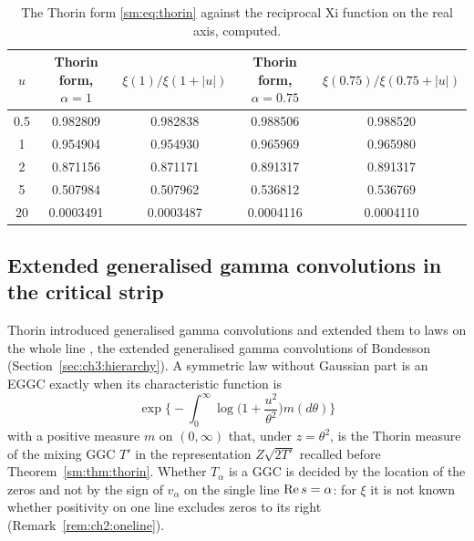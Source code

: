 \begin{table}[htbp]
\centering\small
\setlength{\tabcolsep}{4pt}
\begin{tabular}{@{}ccccc@{}}
\toprule
$u$ & Thorin form, $\alpha=1$ & $\xi(1)/\xi(1+|u|)$ & Thorin form, $\alpha=0.75$ & $\xi(0.75)/\xi(0.75+|u|)$\\
\midrule
0.5 & 0.982809 & 0.982838 & 0.988506 & 0.988520\\
1 & 0.954904 & 0.954930 & 0.965969 & 0.965980\\
2 & 0.871156 & 0.871171 & 0.891317 & 0.891317\\
5 & 0.507984 & 0.507962 & 0.536812 & 0.536769\\
20 & 0.0003491 & 0.0003487 & 0.0004116 & 0.0004110\\
\bottomrule
\end{tabular}
\caption{The Thorin form \eqref{sm:eq:thorin} against the reciprocal Xi function on the real axis, computed.}
\label{sm:tab:thorin}
\end{table}

\subsection{Extended generalised gamma convolutions in the critical strip}\label{sm:sec:strip}

Thorin introduced generalised gamma convolutions \cite{Thorin77a,Thorin} and extended them to laws on the whole line \cite{Thorin78}, the extended generalised gamma convolutions of Bondesson \cite[Section 7.1]{Bondesson} (Section~\ref{sec:ch3:hierarchy}). A symmetric law without Gaussian part is an EGGC exactly when its characteristic function is
\[
\exp\Big\{-\int_0^\infty\log\Big(1+\frac{u^2}{\theta^2}\Big)m(d\theta)\Big\}
\]
with a positive measure $m$ on $(0,\infty)$ that, under $z=\theta^2$, is the Thorin measure of the mixing GGC $T'$ in the representation $Z\sqrt{2T'}$ recalled before Theorem~\ref{sm:thm:thorin}. Whether $T_\alpha$ is a GGC is decided by the location of the zeros and not by the sign of $v_\alpha$ on the single line $\operatorname{Re} s=\alpha$: for $\xi$ it is not known whether positivity on one line excludes zeros to its right (Remark~\ref{rem:ch2:oneline}).

